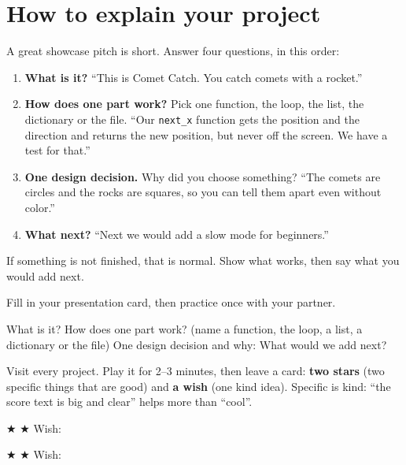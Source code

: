 \section{How to explain your project}
A great showcase pitch is short. Answer four questions, in this order:
\begin{enumerate}
  \item \textbf{What is it?} \enquote{This is Comet Catch. You catch comets with a rocket.}
  \item \textbf{How does one part work?} Pick one function, the loop, the list, the dictionary or the file. \enquote{Our \texttt{next\_x} function gets the position and the direction and returns the new position, but never off the screen. We have a test for that.}
  \item \textbf{One design decision.} Why did you choose something? \enquote{The comets are circles and the rocks are squares, so you can tell them apart even without color.}
  \item \textbf{What next?} \enquote{Next we would add a slow mode for beginners.}
\end{enumerate}
If something is not finished, that is normal. Show what works, then say what you would add next.

\begin{exercise}
Fill in your presentation card, then practice once with your partner.

What is it? 
How does one part work? (name a function, the loop, a list, a dictionary or the file) 
One design decision and why: 
What would we add next? 
\end{exercise}

\begin{exercise}
Visit every project. Play it for 2--3 minutes, then leave a card: \textbf{two stars} (two specific
things that are good) and \textbf{a wish} (one kind idea). Specific is kind: \enquote{the score
text is big and clear} helps more than \enquote{cool}.

\begin{tcolorbox}[colback=white,colframe=kcpurple!80!black,boxrule=0.8pt,arc=2pt,title={\small\bfseries Feedback card for: \rule{4cm}{0.4pt}},coltitle=black,colbacktitle=kcpurple!25]
★ 
★ 
Wish: 
\end{tcolorbox}
\begin{tcolorbox}[colback=white,colframe=kcpurple!80!black,boxrule=0.8pt,arc=2pt,title={\small\bfseries Feedback card for: \rule{4cm}{0.4pt}},coltitle=black,colbacktitle=kcpurple!25]
★ 
★ 
Wish: 
\end{tcolorbox}
\end{exercise}

